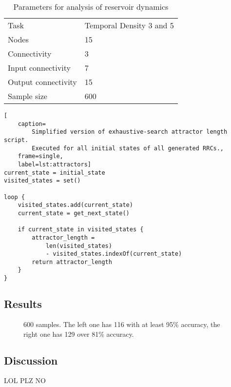 \begin{table}[ht]
    \centering
    \caption{Parameters for analysis of reservoir dynamics}
    \label{tab:reservoir-dynamics-parameters}
    \begin{tabular}{ll}
        Task                & Temporal Density 3 and 5  \\
        Nodes               & 15                        \\
        Connectivity        & 3                         \\
        Input connectivity  & 7                         \\
        Output connectivity & 15                        \\
        Sample size         & 600
    \end{tabular}
\end{table}

\begin{minipage}{\linewidth}
\begin{lstlisting}[
    caption=
        Simplified version of exhaustive-search attractor length script.
        Executed for all initial states of all generated RRCs.,
    frame=single,
    label=lst:attractors]
current_state = initial_state
visited_states = set()

loop {
    visited_states.add(current_state)
    current_state = get_next_state()

    if current_state in visited_states {
        attractor_length =
            len(visited_states)
            - visited_states.indexOf(current_state)
        return attractor_length
    }
}
\end{lstlisting}
\end{minipage}

\subsection{Results}

\begin{figure*}
    \centering
    \caption{
        600 samples. The left one has 116 with at least 95\% accuracy,
        the right one has 129 over 81\% accuracy.
    }
\end{figure*}

\subsection{Discussion}

LOL PLZ NO
